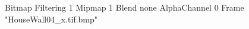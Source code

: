 {Bitmap
	{Filtering 1}
	{Mipmap 1}
	{Blend none}
	{AlphaChannel 0}
	{Frame "HouseWall04_x.tif.bmp"}
}
